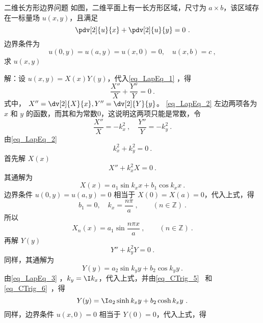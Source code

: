 \begin{example}{二维长方形边界问题}
如图，二维平面上有一长方形区域，尺寸为 $a\times b$，该区域存在一标量场 $u(x,y)$，且满足
\begin{equation}\label{eq_LapEq_1}
\pdv[2]{u}{x}+\pdv[2]{u}{y}=0~.
\end{equation}
边界条件为
\begin{equation}
u(0,y)=u(a,y)=u(x,0)=0,\quad u(x,b)=c~,
\end{equation}
求 $u(x,y)$

解：设 $u(x,y)=X(x)Y(y)$，代入\autoref{eq_LapEq_1} ，得
\begin{equation}\label{eq_LapEq_2}
\frac{X''}{X}+\frac{Y''}{Y}=0~.
\end{equation}
式中， $X''=\dv[2]{X}{x},Y''=\dv[2]{Y}{y}$。
\autoref{eq_LapEq_2} 左边两项各为 $x$ 和 $y$ 的函数，而其和为常数0，这说明这两项只能是常数，令
\begin{equation}
\frac{X''}{X}=-k_x^2~,\quad \frac{Y''}{Y}=-k_y^2~.
\end{equation}
由\autoref{eq_LapEq_2} 
\begin{equation}\label{eq_LapEq_3}
k_x^2+k_y^2=0~.
\end{equation}
首先解 $X(x)$
\begin{equation}
X''+k_x^2X=0~.
\end{equation}
其通解为
\begin{equation}
X(x)=a_1\sin k_x x+b_1\cos k_x x~.
\end{equation}
边界条件 $u(0,y)=u(a,y)=0$ 相当于 $X(0)=X(a)=0$，代入上式，得
\begin{equation}
b_1=0,\quad k_x=\frac{n\pi}{a} ~,\qquad (n\in \mathbb{Z})~.
\end{equation}
所以
\begin{equation}
X_n(x)=a_1\sin\frac{n\pi x}{a}~,\qquad (n\in \mathbb{Z})~.
\end{equation}
再解 $Y(y)$
\begin{equation}
Y''+k_y^2Y=0~.
\end{equation}
同样，其通解为
\begin{equation}
Y(y)=a_2\sin k_y y+b_2\cos k_y y~.
\end{equation}
由\autoref{eq_LapEq_3} ，$k_y=\I k_x$，代入上式，并由\autoref{eq_CTrig_5}~ 和\autoref{eq_CTrig_6}~，得
\begin{equation}
Y(y)=\I a_2\sinh k_x y+b_2\cosh k_x y~.
\end{equation}
同样，边界条件 $u(x,0)=0$ 相当于 $Y(0)=0$，代入上式，得
\begin{equation}

\end{equation}
\end{example}
